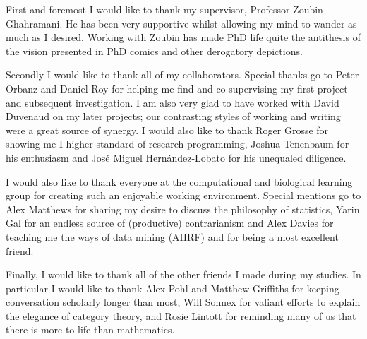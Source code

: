 
\begin{acknowledgements}      

First and foremost I would like to thank my supervisor, Professor Zoubin Ghahramani.
He has been very supportive whilst allowing my mind to wander as much as I desired.
Working with Zoubin has made PhD life quite the antithesis of the vision presented in PhD comics and other derogatory depictions.

Secondly I would like to thank all of my collaborators.
Special thanks go to Peter Orbanz and Daniel Roy for helping me find and co-supervising my first project and subsequent investigation.
I am also very glad to have worked with David Duvenaud on my later projects; our contrasting styles of working and writing were a great source of synergy.
I would also like to thank Roger Grosse for showing me I higher standard of research programming, Joshua Tenenbaum for his enthusiasm and Jos\'{e} Miguel Hern\'{a}ndez-Lobato for his unequaled diligence.

I would also like to thank everyone at the computational and biological learning group for creating such an enjoyable working environment.
Special mentions go to Alex Matthews for sharing my desire to discuss the philosophy of statistics, Yarin Gal for an endless source of (productive) contrarianism and Alex Davies for teaching me the ways of data mining (AHRF) and for being a most excellent friend.

Finally, I would like to thank all of the other friends I made during my studies.
In particular I would like to thank Alex Pohl and Matthew Griffiths for keeping conversation scholarly longer than most, Will Sonnex for valiant efforts to explain the elegance of category theory, and Rosie Lintott for reminding many of us that there is more to life than mathematics.

\end{acknowledgements}
